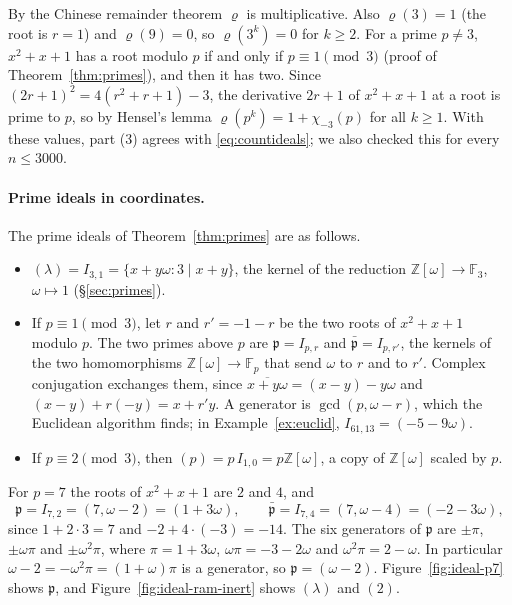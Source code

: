 \documentclass[11pt]{article}
\numberwithin{equation}{section}
\newcommand{\OO}{\mathbb Z[\omega]}
\newcommand{\F}{\mathbb F}
\newcommand{\ch}{\chi_{-3}}
\theoremstyle{definition}
\theoremstyle{remark}
\begin{document}
By the Chinese remainder theorem $\varrho$ is multiplicative. Also $\varrho(3)=1$ (the root is $r=1$) and
$\varrho(9)=0$, so $\varrho(3^k)=0$ for $k\ge2$. For a prime $p\ne3$, $x^2+x+1$ has a root modulo $p$ if and only if
$p\equiv1\pmod3$ (proof of Theorem~\ref{thm:primes}), and then it has two. Since $(2r+1)^2=4(r^2+r+1)-3$, the
derivative $2r+1$ of $x^2+x+1$ at a root is prime to $p$, so by Hensel's lemma $\varrho(p^k)=1+\ch(p)$ for all $k\ge1$.
With these values, part (3) agrees with \eqref{eq:countideals}; we also checked this for every $n\le3000$.

\paragraph{Prime ideals in coordinates.} The prime ideals of Theorem~\ref{thm:primes} are as follows.
\begin{itemize}
\item $(\lambda)=I_{3,1}=\{x+y\omega:3\mid x+y\}$, the kernel of the reduction $\OO\to\F_3$, $\omega\mapsto1$
(\S\ref{sec:primes}).
\item If $p\equiv1\pmod3$, let $r$ and $r'=-1-r$ be the two roots of $x^2+x+1$ modulo $p$. The two primes
above $p$ are $\mathfrak p=I_{p,r}$ and $\bar{\mathfrak p}=I_{p,r'}$, the kernels of the two homomorphisms
$\OO\to\F_p$ that send $\omega$ to $r$ and to $r'$. Complex conjugation exchanges them, since
$\overline{x+y\omega}=(x-y)-y\omega$ and $(x-y)+r(-y)=x+r'y$. A generator is $\gcd(p,\omega-r)$, which the
Euclidean algorithm finds; in Example~\ref{ex:euclid}, $I_{61,13}=(-5-9\omega)$.
\item If $p\equiv2\pmod 3$, then $(p)=p\,I_{1,0}=p\OO$, a copy of $\OO$ scaled by $p$.
\end{itemize}
For $p=7$ the roots of $x^2+x+1$ are $2$ and $4$, and
\begin{equation}\label{eq:p7}
 \mathfrak p=I_{7,2}=(7,\omega-2)=(1+3\omega),\qquad \bar{\mathfrak p}=I_{7,4}=(7,\omega-4)=(-2-3\omega),
\end{equation}
since $1+2\cdot3=7$ and $-2+4\cdot(-3)=-14$. The six generators of $\mathfrak p$ are $\pm\pi$, $\pm\omega\pi$ and
$\pm\omega^2\pi$, where $\pi=1+3\omega$, $\omega\pi=-3-2\omega$ and $\omega^2\pi=2-\omega$. In particular
$\omega-2=-\omega^2\pi=(1+\omega)\pi$ is a generator, so $\mathfrak p=(\omega-2)$. Figure~\ref{fig:ideal-p7}
shows $\mathfrak p$, and Figure~\ref{fig:ideal-ram-inert} shows $(\lambda)$ and $(2)$.
\end{document}

